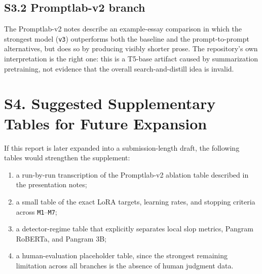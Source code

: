 \documentclass[11pt]{article}
\begin{document}
\subsection*{S3.2 Promptlab-v2 branch}

The Promptlab-v2 notes describe an example-essay comparison in which the strongest model (\texttt{v3}) outperforms both the baseline and the prompt-to-prompt alternatives, but does so by producing visibly shorter prose. The repository's own interpretation is the right one: this is a T5-base artifact caused by summarization pretraining, not evidence that the overall search-and-distill idea is invalid.

\section*{S4. Suggested Supplementary Tables for Future Expansion}

If this report is later expanded into a submission-length draft, the following tables would strengthen the supplement:

\begin{enumerate}
\item a run-by-run transcription of the Promptlab-v2 ablation table described in the presentation notes;
\item a small table of the exact LoRA targets, learning rates, and stopping criteria across \texttt{M1}--\texttt{M7};
\item a detector-regime table that explicitly separates local slop metrics, Pangram RoBERTa, and Pangram 3B;
\item a human-evaluation placeholder table, since the strongest remaining limitation across all branches is the absence of human judgment data.
\end{enumerate}
\end{document}
